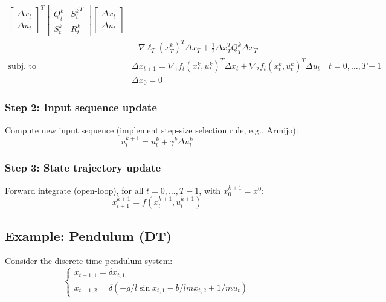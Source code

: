 \documentclass[openany]{book}
\theoremstyle{definition}
\theoremstyle{remark}
\begin{document}
\begin{enumerate}
\begin{align*}
\begin{bmatrix}
                \Delta x_t \\ \Delta u_t
            \end{bmatrix}^T \begin{bmatrix}
                Q_t^k & {S_t^k}^T \\ S_t^k & R_t^k
            \end{bmatrix}\begin{bmatrix}
                \Delta x_t \\ \Delta u_t
            \end{bmatrix}\\
            &+ \nabla\ell_T(x_T^k)^T\Delta x_T + \displaystyle\frac{1}{2}\Delta x_T^TQ_T^k\Delta x_T\\
            \text{subj.\ to } & \Delta x_{t+1} = \nabla_1f_t(x_t^k,u_t^k)^T\Delta x_t + \nabla_2f_t(x_t^k,u_t^k)^T\Delta u_t \quad t=0,\dots,T-1\\
            & \Delta x_0 = 0
        \end{align*}
\end{enumerate}

\subsubsection{Step 2: Input sequence update}
Compute new input sequence (implement step-size selection rule, e.g., Armijo):
\[
    u_t^{k+1} = u_t^k + \gamma^k\Delta u_t^k
\]

\subsubsection{Step 3: State trajectory update}
Forward integrate (open-loop), for all $t=0,\dots,T-1$, with $x_0^{k+1}=x^0$:
\[
    x_{t+1}^{k+1} = f(x_t^{k+1},u_t^{k+1})
\]

\subsection{Example: Pendulum (DT)}
Consider the discrete-time pendulum system:
\[
    \begin{cases}
        x_{t+1,1} = \delta x_{t,1}\\
        x_{t+1,2} = \delta(-g/l\sin x_{t,1}-b/lm x_{t,2}+1/m u_t)
    \end{cases}
\]
\end{document}
